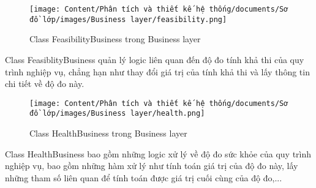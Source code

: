 \begin{figure}[H]
    \centering
    \texttt{[image: Content/Phân tích và thiết kế hệ thống/documents/Sơ đồ lớp/images/Business layer/feasibility.png]}
    \vspace{0.5cm}
    \caption{Class FeasibilityBusiness trong Business layer}
    \label{fig:Class FeasibilityBusiness trong Business layer}
\end{figure}
\par
Class FeasiblityBusiness quản lý logic liên quan đến độ đo tính khả thi của quy trình nghiệp vụ, chẳng hạn như thay đổi giá trị 
của tính khả thi và lấy thông tin chi tiết về độ đo này.
\begin{figure}[H]
    \centering
    \texttt{[image: Content/Phân tích và thiết kế hệ thống/documents/Sơ đồ lớp/images/Business layer/health.png]}
    \vspace{0.5cm}
    \caption{Class HealthBusiness trong Business layer}
    \label{fig:Class HealthBusiness trong Business layer}
\end{figure}
\par
Class HealthBusiness bao gồm những logic xử lý về độ đo sức khỏe của quy trình nghiệp vụ, bao gồm những hàm xử lý như tính toán 
giá trị của độ đo này, lấy những tham số liên quan để tính toán được giá trị cuối cùng của độ đo,...
